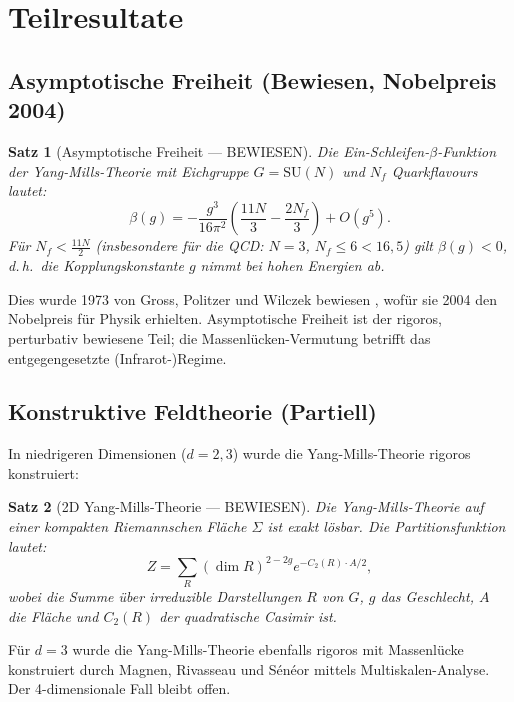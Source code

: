 \documentclass[12pt,a4paper]{amsart}
\newtheorem{theorem}{Satz}[section]
\theoremstyle{definition}
\theoremstyle{remark}
\begin{document}
\section{Teilresultate}
\label{sec:teilresultate}

\subsection{Asymptotische Freiheit (Bewiesen, Nobelpreis 2004)}

\begin{theorem}[Asymptotische Freiheit — BEWIESEN]
\label{satz:asymp-freiheit}
Die Ein-Schleifen-$\beta$-Funktion der Yang-Mills-Theorie mit Eichgruppe
$G = \mathrm{SU}(N)$ und $N_f$ Quarkflavours lautet:
\[
  \beta(g) = -\frac{g^3}{16\pi^2} \left( \frac{11N}{3} - \frac{2N_f}{3} \right) + O(g^5).
\]
Für $N_f < \frac{11N}{2}$ (insbesondere für die QCD: $N=3$, $N_f \leq 6 < 16{,}5$)
gilt $\beta(g) < 0$, d.\,h.\ die Kopplungskonstante $g$ nimmt bei hohen Energien ab.
\end{theorem}

Dies wurde 1973 von Gross, Politzer und Wilczek bewiesen
\cite{GrossWilczek1973,Politzer1973}, wofür sie 2004 den Nobelpreis für Physik erhielten.
Asymptotische Freiheit ist der rigoros, perturbativ bewiesene Teil; die Massenlücken-Vermutung
betrifft das entgegengesetzte (Infrarot-)Regime.

\subsection{Konstruktive Feldtheorie (Partiell)}

In niedrigeren Dimensionen ($d = 2, 3$) wurde die Yang-Mills-Theorie rigoros konstruiert:

\begin{theorem}[2D Yang-Mills-Theorie — BEWIESEN]
Die Yang-Mills-Theorie auf einer kompakten Riemannschen Fläche $\Sigma$ ist exakt lösbar.
Die Partitionsfunktion lautet:
\[
  Z = \sum_R (\dim R)^{2-2g} e^{-C_2(R) \cdot A / 2},
\]
wobei die Summe über irreduzible Darstellungen $R$ von $G$, $g$ das Geschlecht, $A$
die Fläche und $C_2(R)$ der quadratische Casimir ist.
\end{theorem}

Für $d = 3$ wurde die Yang-Mills-Theorie ebenfalls rigoros mit Massenlücke konstruiert
durch Magnen, Rivasseau und Sénéor \cite{MagnenRivasseau1993} mittels Multiskalen-Analyse.
Der 4-dimensionale Fall bleibt offen.
\end{document}
